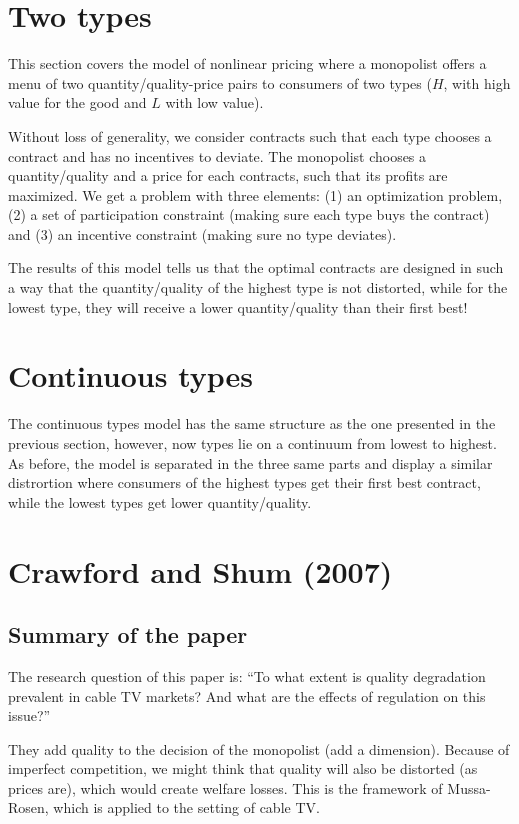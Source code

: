 \section{Two types}

This section covers the model of nonlinear pricing where a monopolist offers a menu of two quantity/quality-price pairs to consumers of two types ($H$, with high value for the good and $L$ with low value).

Without loss of generality, we consider contracts such that each type chooses a contract and has no incentives to deviate. The monopolist chooses a quantity/quality and a price for each contracts, such that its profits are maximized. We get a problem with three elements: (1) an optimization problem, (2) a set of participation constraint (making sure each type buys the contract) and (3) an incentive constraint (making sure no type deviates).

The results of this model tells us that the optimal contracts are designed in such a way that the quantity/quality of the highest type is not distorted, while for the lowest type, they will receive a lower quantity/quality than their first best!

\section{Continuous types}

The continuous types model has the same structure as the one presented in the previous section, however, now types lie on a continuum from lowest to highest. As before, the model is separated in the three same parts and display a similar distrortion where consumers of the highest types get their first best contract, while the lowest types get lower quantity/quality.

\section{Crawford and Shum (2007)}

\subsection{Summary of the paper}

The research question of this paper is: ``To what extent is quality degradation prevalent in cable TV markets? And what are the effects of regulation on this issue?''

They add quality to the decision of the monopolist (add a dimension). Because of imperfect competition, we might think that quality will also be distorted (as prices are), which would create welfare losses. This is the framework of Mussa-Rosen, which is applied to the setting of cable TV.

